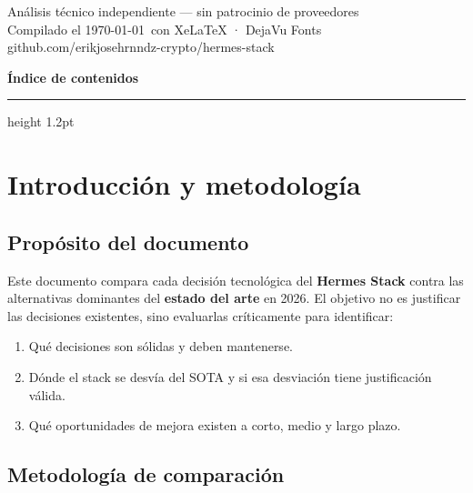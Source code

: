 \documentclass[11pt,a4paper]{article}
\begin{document}
\vspace{2cm}
\begin{center}
{\small\sffamily\color{sotagray}
Análisis técnico independiente — sin patrocinio de proveedores\\
Compilado el \today\ con XeLaTeX · DejaVu Fonts}\\[6pt]
{\footnotesize\sffamily\color{sotagray}
github.com/erikjosehrnndz-crypto/hermes-stack}
\end{center}

\newpage

\thispagestyle{fancy}
{\color{sotared}\sffamily\Large\bfseries Índice de contenidos}\\[4pt]
{\color{sotaorange}\hrule height 1.2pt}
\vspace{12pt}
\setcounter{tocdepth}{2}
\renewcommand{\contentsname}{}
\tableofcontents

\newpage

\section{Introducción y metodología}

\subsection{Propósito del documento}

Este documento compara cada decisión tecnológica del \textbf{Hermes Stack} contra las alternativas dominantes del \textbf{estado del arte} en 2026. El objetivo no es justificar las decisiones existentes, sino evaluarlas críticamente para identificar:

\begin{enumerate}[leftmargin=*]
\item Qué decisiones son sólidas y deben mantenerse.
\item Dónde el stack se desvía del SOTA y si esa desviación tiene justificación válida.
\item Qué oportunidades de mejora existen a corto, medio y largo plazo.
\end{enumerate}

\subsection{Metodología de comparación}
\end{document}
